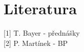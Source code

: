 \documentclass{article}
\begin{document}
\newpage
\section{Literatura}

[1] T. Bayer - přednášky \\

[2] P. Martínek - BP

\end{document}

